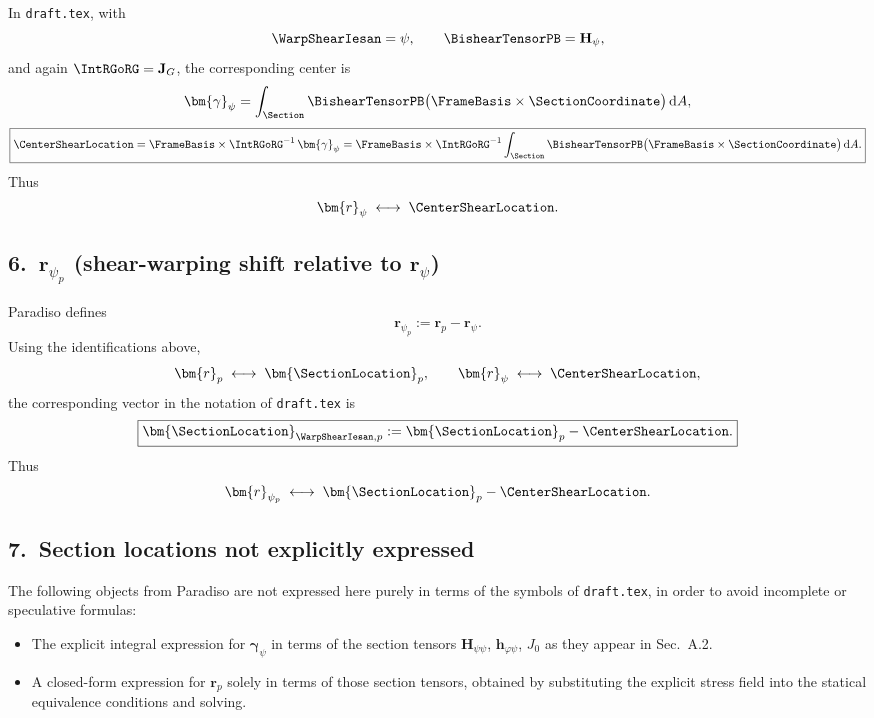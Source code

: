 In \texttt{draft.tex}, with
\begin{equation}
  \WarpShearIesan = \psi,
  \qquad
  \BishearTensorPB = \mathbf{H}_\psi,
\end{equation}
and again $\IntRGoRG = \mathbf{J}_G$, the corresponding center is
\begin{equation}
  \bm{\gamma}_\psi
  = \int_\Section \BishearTensorPB\bigl(\FrameBasis\times\SectionCoordinate\bigr)\,\mathrm{d}A,
\end{equation}
\begin{equation}
  \boxed{
  \CenterShearLocation
  = \FrameBasis\times\IntRGoRG^{-1}\,\bm{\gamma}_\psi
  = \FrameBasis\times\IntRGoRG^{-1}
    \int_\Section \BishearTensorPB\bigl(\FrameBasis\times\SectionCoordinate\bigr)\,\mathrm{d}A.}
\end{equation}
Thus
\begin{equation}
  \bm{r}_\psi \;\longleftrightarrow\; \CenterShearLocation.
\end{equation}

\subsection*{6.\ $\bm{r}_{\psi_p}$ (shear-warping shift relative to $\bm{r}_\psi$)}

Paradiso defines
\begin{equation}
  \bm{r}_{\psi_p} := \bm{r}_p - \bm{r}_\psi.
\end{equation}
Using the identifications above,
\begin{equation}
  \bm{r}_p \;\longleftrightarrow\; \bm{\SectionLocation}_p,
  \qquad
  \bm{r}_\psi \;\longleftrightarrow\; \CenterShearLocation,
\end{equation}
the corresponding vector in the notation of \texttt{draft.tex} is
\begin{equation}
  \boxed{
  \bm{\SectionLocation}_{\WarpShearIesan,p}
  := \bm{\SectionLocation}_p - \CenterShearLocation.}
\end{equation}
Thus
\begin{equation}
  \bm{r}_{\psi_p} \;\longleftrightarrow\; \bm{\SectionLocation}_p - \CenterShearLocation.
\end{equation}

\subsection*{7.\ Section locations not explicitly expressed}

The following objects from Paradiso are not expressed here purely in terms of the symbols of \texttt{draft.tex}, in order to avoid incomplete or speculative formulas:
\begin{itemize}
  \item The explicit integral expression for $\bm{\gamma}_\psi$ in terms of the section tensors
        $\mathbf{H}_{\psi\psi}$, $\mathbf{h}_{\varphi\psi}$, $J_0$ as they appear in Sec.~A.2.
  \item A closed-form expression for $\bm{r}_p$ solely in terms of those section tensors, obtained by
        substituting the explicit stress field into the statical equivalence conditions and solving.
\end{itemize}

